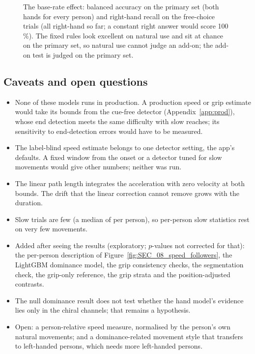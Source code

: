 \begin{figure}[tbp]
\centering
{}
\caption{The base-rate effect: balanced accuracy on the primary set (both hands for every person) and right-hand
recall on the  free-choice trials (all right-hand so far; a constant right answer would score
100\,\%). The fixed rules look excellent on natural use and sit at chance on the primary set, so natural use cannot
judge an add-on; the add-on test is judged on the primary set.}
\label{fig:DEMO_02_base_rate}\label{fig:app:sec-demo-base-rate}
\end{figure}


\FloatBarrier
\subsection{Caveats and open questions}\label{app:sec:caveats}

\begin{itemize}[nosep]
\item None of these models runs in production. A production speed or grip estimate would take its bounds from the
  cue-free detector (Appendix~\ref{app:prod}), whose end detection meets the same difficulty with slow reaches; its
  sensitivity to end-detection errors would have to be measured.
\item The label-blind speed estimate belongs to one detector setting, the app's defaults. A fixed window from the
  onset or a detector tuned for slow movements would give other numbers; neither was run.
\item The linear path length integrates the acceleration with zero velocity at both bounds. The drift that the
  linear correction cannot remove grows with the duration.
\item Slow trials are few (a median of  per person), so per-person slow statistics
  rest on very few movements.
\item Added after seeing the results (exploratory; $p$-values not corrected for that): the per-person description
  of Figure~\ref{fig:SEC_08_speed_followers}, the LightGBM dominance model, the grip consistency checks, the
  segmentation check, the grip-only reference, the grip strata and the position-adjusted contrasts.
\item The null dominance result does not test whether the hand model's evidence lies only in the chiral channels;
  that remains a hypothesis.
\item Open: a person-relative speed measure, normalised by the person's own natural movements; and a
  dominance-related movement style that transfers to left-handed persons, which needs more left-handed persons.
\end{itemize}

